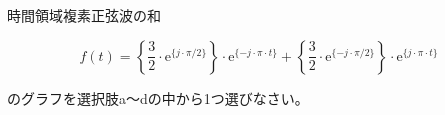 時間領域複素正弦波の和

\[
f(t) =
   \left \{ \frac{3}{2} \cdot \textrm{e}^{\{j \cdot \pi/2 \}} \right \} \cdot \textrm{e}^{\{-j \cdot \pi \cdot t \}}
+  \left \{ \frac{3}{2} \cdot \textrm{e}^{\{-j  \cdot \pi/2 \}} \right \} \cdot \textrm{e}^{\{j \cdot \pi \cdot t \}}
\]

\bigskip
\noindent  のグラフを選択肢a〜dの中から1つ選びなさい。
